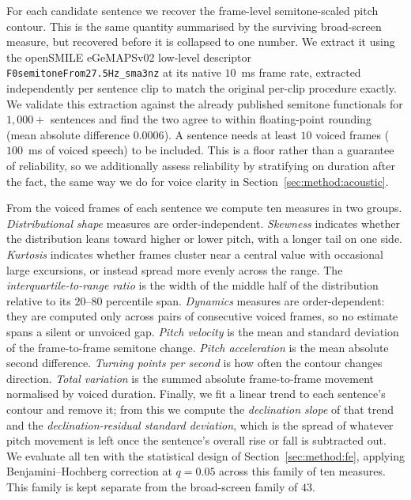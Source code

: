 \documentclass[pdflatex,sn-mathphys-num]{sn-jnl}%
\begin{document}
For each candidate sentence we recover the frame-level semitone-scaled pitch
contour. This is the same quantity summarised by the surviving broad-screen
measure, but recovered before it is collapsed to one number. We extract it
using the openSMILE eGeMAPSv02 low-level descriptor
\texttt{F0semitoneFrom27.5Hz\_sma3nz} at its native $10$~ms frame rate,
extracted independently per sentence clip to match the original per-clip
procedure exactly. We validate this extraction against the already published
semitone functionals for $1{,}000+$ sentences and find the two agree to
within floating-point rounding (mean absolute difference $0.0006$). A
sentence needs at least $10$ voiced frames ($100$~ms of voiced speech) to be
included. This is a floor rather than a guarantee of reliability, so we
additionally assess reliability by stratifying on duration after the fact,
the same way we do for voice clarity in Section~\ref{sec:method:acoustic}.

From the voiced frames of each sentence we compute ten measures in two
groups. \emph{Distributional shape} measures are order-independent.
\emph{Skewness} indicates whether the distribution leans toward higher or
lower pitch, with a longer tail on one side. \emph{Kurtosis} indicates
whether frames cluster near a central value with occasional large
excursions, or instead spread more evenly across the range. The
\emph{interquartile-to-range ratio} is the width of the middle half of the
distribution relative to its $20$--$80$ percentile span. \emph{Dynamics}
measures are order-dependent: they are computed only across pairs of
consecutive voiced frames, so no estimate spans a silent or unvoiced gap.
\emph{Pitch velocity} is the mean and standard deviation of the
frame-to-frame semitone change. \emph{Pitch acceleration} is the mean
absolute second difference. \emph{Turning points per second} is how often
the contour changes direction. \emph{Total variation} is the summed absolute
frame-to-frame movement normalised by voiced duration. Finally, we fit a
linear trend to each sentence's contour and remove it; from this we compute
the \emph{declination slope} of that trend and the
\emph{declination-residual standard deviation}, which is the spread of
whatever pitch movement is left once the sentence's overall rise or fall is
subtracted out. We evaluate all ten with the statistical design of
Section~\ref{sec:method:fe}, applying Benjamini--Hochberg correction at
$q = 0.05$ across this family of ten measures. This family is kept separate
from the broad-screen family of $43$.
\end{document}
